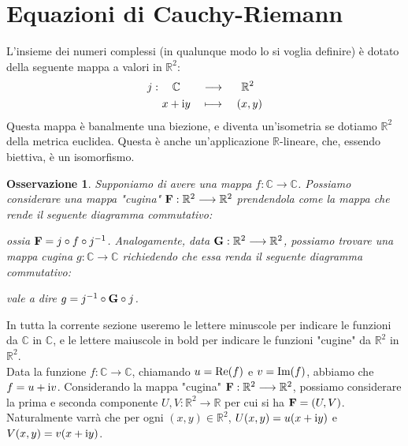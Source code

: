 \documentclass[11pt]{book}
\theoremstyle{Definizione}
\theoremstyle{TeoremaProposizioneLemmaCorollarioCongettura}
\theoremstyle{OsservazioneNotaEsempio}
\newtheorem{myobs}{Osservazione}[section]
\newcommand{\R}{\mathbb{R}}
\newcommand{\C}{\mathbb{C}}
\newcommand{\gro}[1]{\textbf{\textup{#1}}}
\renewcommand{\Re}{\textup{Re}}
\renewcommand{\Im}{\textup{Im}}
\renewcommand{\i}{\textup{i}}
\newcommand*\centra[1]{\omit\hfil$\displaystyle#1$\hfil\ignorespaces}
\begin{document}
\section{Equazioni di Cauchy-Riemann}
L'insieme dei numeri complessi (in qualunque modo lo si voglia definire) è dotato della seguente mappa a valori in $\R^2$:
\begin{alignat*}{3}
j:\ &\centra{\C} &&\longrightarrow &&\centra{\R^2}\\
&\centra{x+\i y} &&\longmapsto &&\centra{\ (x,y)}
\end{alignat*}
Questa mappa è banalmente una biezione, e diventa un'isometria se dotiamo $\R^2$ della metrica euclidea. Questa è anche un'applicazione $\R$-lineare, che, essendo biettiva, è un isomorfismo.\\
\begin{myobs}
Supponiamo di avere una mappa $f:\C\longrightarrow \C$. Possiamo considerare una mappa "cugina" $\gro{F}:\R^2 \longrightarrow \R^2$ prendendola come la mappa che rende il seguente diagramma commutativo:
\begin{center}
\end{center}
ossia $\gro{F} = j \circ f \circ j^{-1}$. Analogamente, data $\gro{G}:\R^2 \longrightarrow \R^2$, possiamo trovare una mappa cugina $g:\C \longrightarrow \C$ richiedendo che essa renda il seguente diagramma commutativo:
\begin{center}
\end{center}
vale a dire $g = j^{-1}\circ \gro{G} \circ j$.
\end{myobs}
In tutta la corrente sezione useremo le lettere minuscole per indicare le funzioni da $\C$ in $\C$, e le lettere maiuscole in bold per indicare le funzioni "cugine" da $\R^2$ in $\R^2$.\\
Data la funzione $f:\C\longrightarrow \C$, chiamando $u = \Re(f)$ e $v = \Im(f)$, abbiamo che $f = u + \i v$. Considerando la mappa "cugina" $\gro{F}:\R^2\longrightarrow \R^2$, possiamo considerare la prima e seconda componente $U,V:\R^2 \longrightarrow \R$ per cui si ha $\gro{F} = (U,V)$. Naturalmente varrà che per ogni $(x,y)\in \R^2$, $U(x,y) = u(x+\i y)$ e $V(x,y) = v(x+\i y)$.\\
\end{document}
